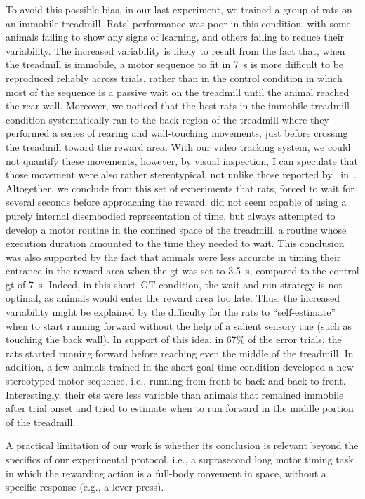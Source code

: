 To avoid this possible bias, in our last experiment, we trained a group of rats on an immobile treadmill.
Rats' performance was poor in this condition, with some animals failing to show any signs of learning, and others failing to reduce their variability.
The increased variability is likely to result from the fact that, when the treadmill is immobile, a motor sequence to fit in 7~s is more difficult to be reproduced reliably across trials, rather than in the control condition in which most of the sequence is a passive wait on the treadmill until the animal reached the rear wall.
Moreover, we noticed that the best rats in the immobile treadmill condition systematically ran to the back region of the treadmill where they performed a series of rearing and wall-touching movements, just before crossing the treadmill toward the reward area.
With our video tracking system, we could not quantify these movements, however, by visual inspection, I can speculate that those movement were also rather stereotypical, not unlike those reported by~\citeauthor{Kawai2015} in~\cite{Kawai2015}.
Altogether, we conclude from this set of experiments that rats, forced to wait for several seconds before approaching the reward, did not seem capable of using a purely internal disembodied representation of time, but always attempted to develop a motor routine in the confined space of the treadmill, a routine whose execution duration amounted to the time they needed to wait.
This conclusion was also supported by the fact that animals were less accurate in timing their entrance in the reward area when the \gls{gt} was set to 3.5~s, compared to the control \gls{gt} of 7~s.
Indeed, in this short~GT condition, the wait-and-run strategy is not optimal, as animals would enter the reward area too late.
Thus, the increased variability might be explained by the difficulty for the rats to ``self-estimate'' when to start running forward without the help of a salient sensory cue (such as touching the back wall).
In support of this idea, in 67\% of the error trials, the rats started running forward before reaching even the middle of the treadmill.
In addition, a few animals trained in the short goal time condition developed a new stereotyped motor sequence, i.e., running from front to back and back to front.
Interestingly, their \glspl{et} were less variable than animals that remained immobile after trial onset and tried to estimate when to run forward in the middle portion of the treadmill.
\par
A practical limitation of our work is whether its conclusion is relevant beyond the specifics of our experimental protocol, i.e., a suprasecond long motor timing task in which the rewarding action is a full-body movement in space, without a specific response (e.g., a lever press).
